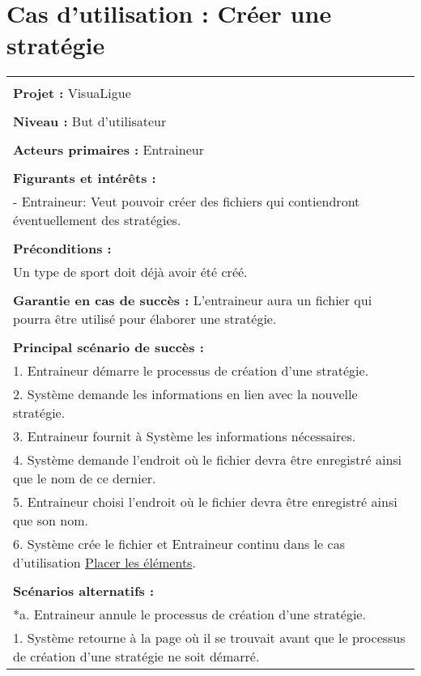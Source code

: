 \section{Cas d'utilisation : Créer une stratégie}
\begin{longtable}{|p{16cm}|}
	\hline
	\\
	\textbf{Projet :} VisuaLigue\\
	\\
	\textbf{Niveau :} But d'utilisateur\\
	\\
	\textbf{Acteurs primaires :} Entraineur\\
	\\
	\textbf{Figurants et intérêts :} \\
	- Entraineur: Veut pouvoir créer des fichiers qui contiendront éventuellement des stratégies.\\
	\\
	\textbf{Préconditions :} \\
	Un type de sport doit déjà avoir été créé. \\
	\\
	\textbf{Garantie en cas de succès :} L'entraineur aura un fichier qui pourra être utilisé pour élaborer une stratégie.\\
	\\
	\textbf{Principal scénario de succès :}\\
	1. Entraineur démarre le processus de création d'une stratégie.\\
	2. Système demande les informations en lien avec la nouvelle stratégie.\\
	3. Entraineur fournit à Système les informations nécessaires.\\
	4. Système demande l'endroit où le fichier devra être enregistré ainsi que le nom de ce dernier.\\
	5. Entraineur choisi l'endroit où le fichier devra être enregistré ainsi que son nom.\\
	6. Système crée le fichier et Entraineur continu dans le cas d'utilisation \underline{Placer les éléments}.\\
	\\
	\textbf{Scénarios alternatifs :}\\
	*a. Entraineur annule le processus de création d'une stratégie.\\
	\hspace{1cm}1. Système retourne à la page où il se trouvait avant que le processus de création d'une stratégie ne soit démarré.\\

\end{longtable}
